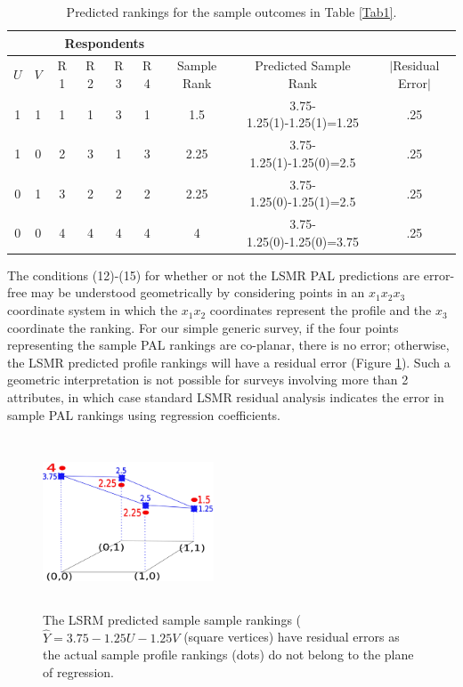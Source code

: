 \documentclass[a4paper, 12pt]{article}
\begin{document}
\begin{table}[!htpb]
	\centering
	\scriptsize
	\begin{tabular}{cc|cccc|c|c|c}
		\multicolumn{2}{c}{} &\multicolumn{4}{c}{Respondents}\\\hline
		$U$ & $V$ & R 1&  R 2& R 3& R 4 &Sample Rank&Predicted Sample Rank& $\mid$Residual Error$|$\\  \hline
		1 &1&1&1&3&1&1.5&3.75-1.25(1)-1.25(1)=1.25&.25\\
		1 &0&2&3&1&3&2.25&3.75-1.25(1)-1.25(0)=2.5&.25 \\
		0 &1&3&2&2&2&2.25 &3.75-1.25(0)-1.25(1)=2.5&.25 \\
		0 &0&4&4&4&4&4 &3.75-1.25(0)-1.25(0)=3.75&.25\\\hline
	\end{tabular}
	\caption{{\small Predicted rankings for the sample outcomes in Table \ref{Tab1}.}}
	\label{Tab9}
\end{table}



The conditions  (12)-(15) for whether or not the LSMR  PAL predictions are error-free may be understood geometrically by considering points in an $x_1x_2x_3$ coordinate system in which the $x_1x_2$ coordinates represent the profile and the $x_3$ coordinate the ranking. For our simple generic survey,  if the four points representing the sample PAL rankings are co-planar, there is no error; otherwise, the LSMR predicted profile rankings will have a residual error (Figure  \ref{sec4fig}).  Such a geometric interpretation  is not possible for surveys involving more than 2 attributes, in which case standard LSMR residual analysis indicates the error in sample  PAL rankings using regression coefficients.


\begin{figure}[!htpb]
	\centering
	\includegraphics[width=2in,height=2in]{sec4fig.png}
	\caption{{\small The LSRM predicted sample sample rankings ($\hat{Y}=3.75-1.25U-1.25V$ (square vertices) have residual errors as the actual sample profile rankings (dots) do not belong to the plane of regression. }}	
	\label{sec4fig}
\end{figure}
\end{document}
